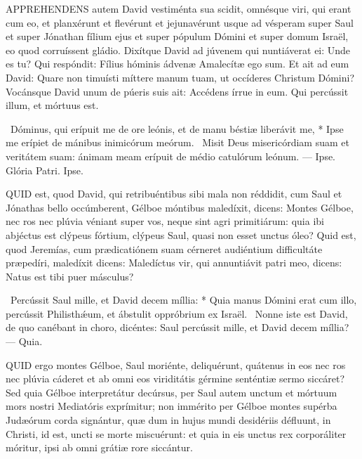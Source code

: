 
\lettrine[lines=2]{A}{PPREHENDENS} autem David vestiménta sua scidit, omnésque viri, qui erant cum eo, et planxérunt et flevérunt et jejunavérunt usque ad vésperam super Saul et super Jónathan fílium ejus et super pópulum Dómini et super domum Israël, eo quod corruíssent gládio. Dixítque David ad júvenem qui nuntiáverat ei: Unde es tu? Qui respóndit: Fílius hóminis ádvenæ Amalecítæ ego sum. Et ait ad eum David: Quare non timuísti míttere manum tuam, ut occíderes Christum Dómini? Vocánsque David unum de púeris suis ait: Accédens írrue in eum. Qui percússit illum, et mórtuus est.

\R\ Dóminus, qui erípuit me de ore leónis, et de manu béstiæ liberávit me, * Ipse me erípiet de mánibus inimicórum meórum. \V\ Misit Deus misericórdiam suam et veritátem suam: ánimam meam erípuit de médio catulórum leónum. --- Ipse. Glória Patri. Ipse.





\lettrine[lines=2]{Q}{UID} est, quod David, qui retribuéntibus sibi mala non réddidit, cum Saul et Jónathas bello occúmberent, Gélboe móntibus maledíxit, dicens: Montes Gélboe, nec ros nec plúvia véniant super vos, neque sint agri primitiárum: quia ibi abjéctus est clýpeus fórtium, clýpeus Saul, quasi non esset unctus óleo? Quid est, quod Jeremías, cum prædicatiónem suam cérneret audiéntium difficultáte præpedíri, maledíxit dicens: Maledíctus vir, qui annuntiávit patri meo, dicens: Natus est tibi puer másculus?

\R\ Percússit Saul mille, et David decem míllia: * Quia manus Dómini erat cum illo, percússit Philisthǽum, et ábstulit oppróbrium ex Israël. \V\ Nonne iste est David, de quo canébant in choro, dicéntes: Saul percússit mille, et David decem míllia? --- Quia.


\lettrine[lines=2]{Q}{UID} ergo montes Gélboe, Saul moriénte, deliquérunt, quátenus in eos nec ros nec plúvia cáderet et ab omni eos viriditátis gérmine senténtiæ sermo siccáret? Sed quia Gélboe interpretátur decúrsus, per Saul autem unctum et mórtuum mors nostri Mediatóris exprímitur; non immérito per Gélboe montes supérba Judæórum corda signántur, quæ dum in hujus mundi desidériis défluunt, in Christi, id est, uncti se morte miscuérunt: et quia in eis unctus rex corporáliter móritur, ipsi ab omni grátiæ rore siccántur.

